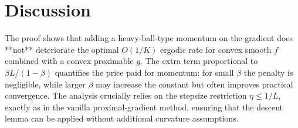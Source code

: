 \documentclass{article}
\begin{document}
\section*{Discussion}
The proof shows that adding a heavy‑ball‑type momentum on the gradient does **not** deteriorate the optimal $O(1/K)$ ergodic rate for convex smooth $f$ combined with a convex proximable $g$.  The extra term proportional to $\beta L/(1-\beta)$ quantifies the price paid for momentum: for small $\beta$ the penalty is negligible, while larger $\beta$ may increase the constant but often improves practical convergence.  The analysis crucially relies on the stepsize restriction $\eta\le 1/L$, exactly as in the vanilla proximal‑gradient method, ensuring that the descent lemma can be applied without additional curvature assumptions.

\end{document}
